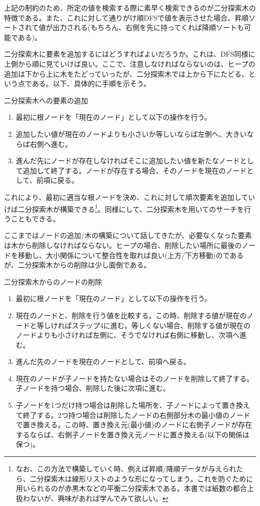 上記の制約のため、所定の値を検索する際に素早く検索できるのが二分探索木の特徴である。また、これに対して通りがけ順DFSで値を表示させた場合、昇順ソートされて値が出力される(もちろん、右側を先に持ってくれば降順ソートも可能である)。

二分探索木に要素を追加するにはどうすればよいだろうか。これは、DFS同様に上側から順に見ていけば良い。ここで、注意しなければならないのは、ヒープの追加は下から上に木をたどっていったが、二分探索木では上から下にたどる、という点である。以下、具体的に手順を示そう。
\begin{itembox}[l]{二分探索木への要素の追加}
\begin{enumerate}
\item 最初に根ノードを「現在のノード」として以下の操作を行う。
\item 追加したい値が現在のノードよりも小さいか等しいならば左側へ、大きいならば右側へ進む。
\item 進んだ先にノードが存在しなければそこに追加したい値を新たなノードとして追加して終了する。ノードが存在する場合、そのノードを現在のノードとして、前項に戻る。
\end{enumerate}
\end{itembox}

これにより、最初に適当な根ノードを決め、これに対して順次要素を追加していけば二分探索木が構築できる\footnote{なお、この方法で構築していく時、例えば昇順/降順データが与えられたら、二分探索木は線形リストのような形になってしまう。これを防ぐために用いられるのが赤黒木などの平衡二分探索木である。本書では紙数の都合上扱わないが、興味があれば学んでみて欲しい。}。同様にして、二分探索木を用いてのサーチを行うこともできる。

ここまではノードの追加/木の構築について話してきたが、必要なくなった要素は木から削除しなければならない。ヒープの場合、削除したい場所に最後のノードを移動し、大小関係について整合性を取れば良い(上方/下方移動)のであるが、二分探索木からの削除は少し面倒である。
\begin{itembox}[l]{二分探索木からのノードの削除}
\begin{enumerate}
\item 最初に根ノードを「現在のノード」として以下の操作を行う。
\item 現在のノードと、削除を行う値を比較する。この時、削除する値が現在のノードと等しければステップ4に進む。等しくない場合、削除する値が現在のノードよりも小さければ左側に、そうでなければ右側に移動し、次項へ進む。
\item 進んだ先のノードを現在のノードとして、前項へ戻る。
\item 現在のノードが子ノードを持たない場合はそのノードを削除して終了する。子ノードを持つ場合、削除した後に次項に進む。
\item 子ノードを1つだけ持つ場合は削除した場所を、子ノードによって置き換えて終了する。2つ持つ場合は削除したノードの右側部分木の最小値のノードで置き換える。この時、置き換え元(最小値)のノードに右側子ノードが存在するならば、右側子ノードを置き換え元ノードに置き換える(以下の関係は保つ)。
\end{enumerate}
\end{itembox}

